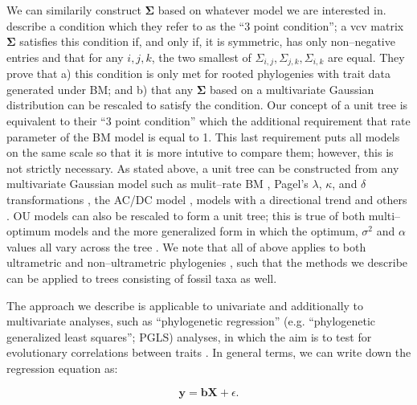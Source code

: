 \documentclass[a4paper,12pt]{article}
\begin{document}
We can similarily construct $\mathbf{\Sigma}$ based on whatever model we are interested in. \citet{HoAne2013} describe a condition which they refer to as the ``3 point condition''; a vcv matrix $\mathbf{\Sigma}$ satisfies this condition if, and only if, it is symmetric, has only non--negative entries and that for any $i,j,k$, the two smallest of $\Sigma_{i,j}, \Sigma_{j,k}, \Sigma_{i,k}$ are equal. They prove that a) this condition is only met for rooted phylogenies with trait data generated under BM; and b) that any $\mathbf{\Sigma}$ based on a multivariate Gaussian distribution can be rescaled to satisfy the condition. Our concept of a unit tree is equivalent to their ``3 point condition'' which the additional requirement that rate parameter of the BM model is equal to 1. This last requirement puts all models on the same scale so that it is more intutive to compare them; however, this is not strictly necessary. As stated above, a unit tree can be constructed from any multivariate Gaussian model such as mulit--rate BM \citep{Omeara2006, Thomas2006, Eastman2011, Revell2012, Motmot}, Pagel's $\lambda$, $\kappa$, and $\delta$ transformations \citep{Pagel1997, Pagel1999}, the AC/DC model \citep{Blomberg2003} \citep[a.k.a. `EB';][]{Harmon2010, SlaterPennell}, models with a directional trend \citep{Hunt2007} and others \citep[e.g.][]{SlaterMEE}. OU models can also be rescaled to form a unit tree; this is true of both multi--optimum \citep{ButlerKing2004} models and the more generalized form \citep{Beaulieu2012, IngramMahler, UyedaBayou} in which the optimum, $\sigma^2$ and $\alpha$ values all vary across the tree \citep{HoAne2013}. We note that all of above applies to both ultrametric and non--ultrametric phylogenies \citep{HoAne2013}, such that the methods we describe can be applied to trees consisting of fossil taxa as well.

The approach we describe is applicable to univariate and additionally to multivariate analyses, such as ``phylogenetic regression'' (e.g. ``phylogenetic generalized least squares''; PGLS) analyses, in which the aim is to test for evolutionary correlations between traits \citep{Grafen1989, Rohlf2001}. In general terms, we can write down the regression equation as:

\begin{equation}
\mathbf{y} = \mathbf{b}\mathbf{X} + \epsilon .
\end{equation}
\end{document}
